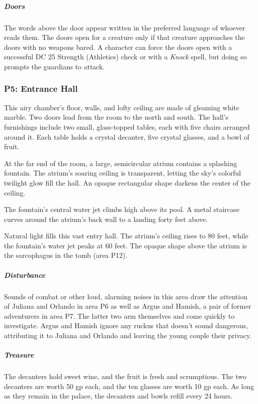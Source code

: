 \documentclass[10pt,a4paper,twoside,bg=print,twocolumn,openany,nodeprecatedcode]{dndbook}
\begin{document}
\subparagraph{Doors}
The words above the door appear written in the preferred language of whoever reads them. The doors open for a creature only if that creature approaches the doors with no weapons bared. A character can force the doors open with a successful DC 25 Strength (Athletics) check or with a \textit{Knock} spell, but doing so prompts the guardians to attack.

\subsubsection{P5: Entrance Hall}
\begin{DndReadAloud}{}
This airy chamber's floor, walls, and lofty ceiling are made of gleaming white marble. Two doors lead from the room to the north and south. The hall's furnishings include two small, glass-topped tables, each with five chairs arranged around it. Each table holds a crystal decanter, five crystal glasses, and a bowl of fruit.

At the far end of the room, a large, semicircular atrium contains a splashing fountain. The atrium's soaring ceiling is transparent, letting the sky's colorful twilight glow fill the hall. An opaque rectangular shape darkens the center of the ceiling.

The fountain's central water jet climbs high above its pool. A metal staircase curves around the atrium's back wall to a landing forty feet above.

\end{DndReadAloud}

Natural light fills this vast entry hall. The atrium's ceiling rises to 80 feet, while the fountain's water jet peaks at 60 feet. The opaque shape above the atrium is the sarcophagus in the tomb (area P12).

\subparagraph{Disturbance}
Sounds of combat or other loud, alarming noises in this area draw the attention of Juliana and Orlando in area P6 as well as Argus and Hamish, a pair of former adventurers in area P7. The latter two arm themselves and come quickly to investigate. Argus and Hamish ignore any ruckus that doesn't sound dangerous, attributing it to Juliana and Orlando and leaving the young couple their privacy.

\subparagraph{Treasure}
The decanters hold sweet wine, and the fruit is fresh and scrumptious. The two decanters are worth 50 gp each, and the ten glasses are worth 10 gp each. As long as they remain in the palace, the decanters and bowls refill every 24 hours.
\end{document}
